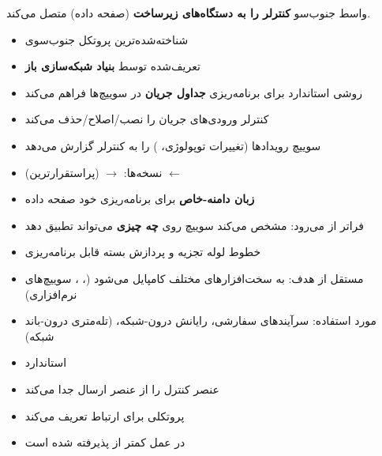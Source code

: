 
واسط جنوب‌سو \textbf{کنترلر را به دستگاه‌های زیرساخت} (صفحه داده) متصل می‌کند.


\begin{itemize}
\tightlist
\item
  شناخته‌شده‌ترین پروتکل جنوب‌سوی 
\item
  تعریف‌شده توسط \textbf{بنیاد شبکه‌سازی باز }
\item
  روشی استاندارد برای برنامه‌ریزی \textbf{جداول جریان} در سوییچ‌ها فراهم می‌کند
\item
  کنترلر ورودی‌های جریان را نصب/\allowbreak{}اصلاح/\allowbreak{}حذف می‌کند
\item
  سوییچ رویدادها (تغییرات توپولوژی، ) را به کنترلر گزارش می‌دهد
\item
  نسخه‌ها:  \ensuremath{\to}  (پراستقرارترین) \ensuremath{\leftarrow} 
\end{itemize}


\begin{itemize}
\tightlist
\item
  \textbf{زبان دامنه-خاص} برای برنامه‌ریزی خود صفحه داده
\item
  فراتر از  می‌رود: مشخص می‌کند سوییچ روی \textbf{چه چیزی} می‌تواند تطبیق دهد
\item
  خطوط لوله تجزیه و پردازش بسته قابل برنامه‌ریزی
\item
  مستقل از هدف: به سخت‌افزارهای مختلف کامپایل می‌شود (، ، سوییچ‌های نرم‌افزاری)
\item
  مورد استفاده: سرآیندهای سفارشی، رایانش درون-شبکه،  (تله‌متری درون-باند شبکه)
\end{itemize}


\begin{itemize}
\tightlist
\item
  استاندارد 
\item
  عنصر کنترل  را از عنصر ارسال  جدا می‌کند
\item
  پروتکلی برای ارتباط  تعریف می‌کند
\item
  در عمل کمتر از  پذیرفته شده است
\end{itemize}

